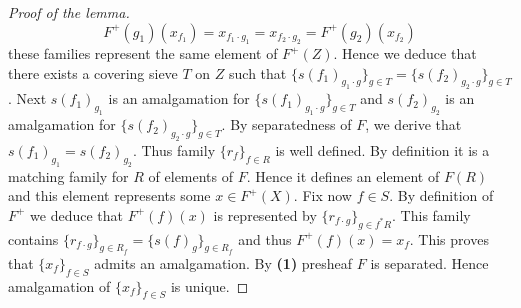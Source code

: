 \begin{proof}[Proof of the lemma]
$$F^+(g_1)(x_{f_1})=x_{f_1\cdot g_1}=x_{f_2\cdot g_2}=F^+(g_2)(x_{f_2})$$
these families represent the same element of $F^+(Z)$. Hence we deduce that there exists a covering sieve $T$ on $Z$ such that $\{s(f_1)_{g_1\cdot g}\}_{g\in T}=\{s(f_2)_{g_2\cdot g}\}_{g\in T}$. Next $s(f_1)_{g_1}$ is an amalgamation for $\{s(f_1)_{g_1\cdot g}\}_{g\in T}$ and $s(f_2)_{g_2}$ is an amalgamation for $\{s(f_2)_{g_2\cdot g}\}_{g\in T}$. By separatedness of $F$, we derive that $s(f_1)_{g_1}=s(f_2)_{g_2}$. Thus family $\{r_f\}_{f\in R}$ is well defined. By definition it is a matching family for $R$ of elements of $F$. Hence it defines an element of $F(R)$ and this element represents some $x\in F^+(X)$. Fix now $f\in S$. By definition of $F^+$ we deduce that $F^+(f)(x)$ is represented by $\{r_{f\cdot g}\}_{g\in f^*R}$. This family contains $\{r_{f\cdot g}\}_{g\in R_f}=\{s(f)_{g}\}_{g\in R_f}$ and thus $F^+(f)(x)=x_f$. This proves that $\{x_f\}_{f\in S}$ admits an amalgamation. By \textbf{(1)} presheaf $F$ is separated. Hence amalgamation of $\{x_f\}_{f\in S}$ is unique.
\end{proof}

